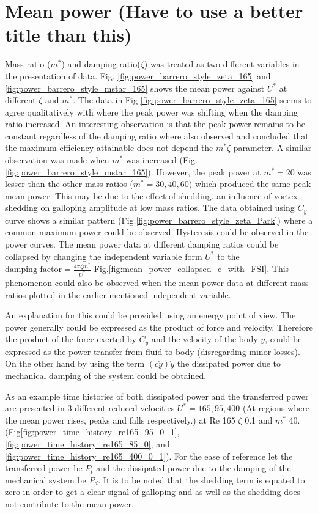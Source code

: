 

\section{Mean power (Have to use a better title than this)}

Mass ratio ($m^*$) and damping ratio($\zeta$) was treated as two different variables in the presentation of data. Fig.  \ref{fig:power_barrero_style_zeta_165} and \ref{fig:power_barrero_style_mstar_165} shows the mean power against $U^*$ at different $\zeta$ and  $m^*$. The data in Fig \ref{fig:power_barrero_style_zeta_165} seems to agree qualitatively with \cite{Barrero-Gil2010a} where the peak power was shifting when the damping ratio increased. An interesting observation is that the peak power remains to be constant regardless of the damping ratio where \cite{Barrero-Gil2010a} also observed and concluded that the maximum efficiency attainable does not depend the $m^*\zeta$ parameter. A similar observation was made when $m^*$ was increased (Fig.\ref{fig:power_barrero_style_mstar_165}). However, the peak power at $m^*=20$ was lesser than the other mass ratios ($m^*=30,40,60$) which produced the same peak mean power. This may be due to the effect of shedding. \cite{Joly2012}  an influence of vortex shedding on galloping amplitude at low mass ratios. The data obtained using \cite{Parkinson1964} $C_y$ curve shows a similar pattern (Fig.\ref{fig:power_barrero_style_zeta_Park}) where a common maximum power could be observed. Hysteresis could be observed in the power curves.
The mean power data at different damping ratios could be collapsed by changing the independent variable form $U^*$ to the $\text{damping factor}= \frac{4\pi\zeta m^*}{U^*}$ Fig.\ref{fig:mean_power_collapsed_c_with_FSI}. This phenomenon could also be observed when the mean power data at different mass ratios plotted in the earlier mentioned independent variable.


An explanation for this could be provided using an energy point of view. The power generally could be expressed as the product of force and velocity. Therefore  the product of the  force exerted by $C_y$ and the velocity of the body $\dot{y}$, could be expressed as the power transfer from fluid to body (disregarding minor losses). On the other hand by using the term $(c\dot{y})\dot{y}$  the dissipated power due to mechanical damping of the system could be obtained.

As an example time histories of both dissipated power and the transferred power are presented in 3 different reduced velocities $U^*=165,95 ,400$  (At regions where the mean power rises, peaks and falls respectively.)  at Re 165 $\zeta $ 0.1 and $m^*$ 40.  (Fig\ref{fig:power_time_history_re165_95_0_1}, \ref{fig:power_time_history_re165_85_0},  and \ref{fig:power_time_history_re165_400_0_1}). For the ease of reference let the transferred power be $P_t$ and the dissipated power due to the damping of the mechanical system be $P_d$. It is to be noted that the shedding term is equated to zero in order to get a clear signal of galloping and as well as the shedding does not contribute to the mean power. 



